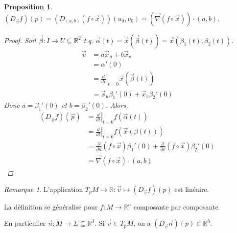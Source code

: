 \documentclass{report}
\newtheorem*{prop}{Proposition}
\theoremstyle{definition}
\theoremstyle{remark}
\newtheorem*{rmq}{Remarque}
\def\RR{\mathbb{R}}
\begin{document}
	\begin{prop}
		$(D_{\vec v}f)(p) = (D_{(a,b)}(f\circ\vec x))(u_0,v_0) = (\vec\nabla(f\circ\vec x))\cdot(a,b)$.
		\begin{proof}
			Soit $\vec\beta:I\to U\subseteq\RR^2$ t.q. $\vec\alpha(t)=\vec x(\vec\beta(t)) = \vec x(\beta_1(t), \beta_2(t))$.
			\begin{align*}
				\vec v&= a\vec x_u+b\vec x_v\\
				&= \alpha'(0)\\
				&= \left.\frac{d}{dt}\right|_{t=0}\vec x(\vec\beta(t))\\
				&= \vec x_u\beta_1'(0)+\vec x_v\beta_2'(0)
			\end{align*}
			Donc $a=\beta_1'(0)$ et $b=\beta_2'(0)$. Alors,
			\begin{align*}
				(D_{\vec v}f)(\vec p)&= \left.\frac{d}{dt}\right|_{t=0} f(\vec\alpha(t))\\
				&= \left.\frac{d}{dt}\right|_{t=0} f(\vec x(\beta(t)))\\
				&= \frac{\partial}{\partial u}(f\circ\vec x)\beta_1'(0) + \frac{\partial}{\partial v}(f\circ\vec x)\beta_2'(0)\\
				&= \vec\nabla(f\circ\vec x)\cdot(a,b)
			\end{align*}
		\end{proof}
	\end{prop}

	\begin{rmq}
		L'application $T_pM\to\RR : \vec v\mapsto(D_{\vec v}f)(p)$ est lin\'eaire.

		La d\'efinition se g\'en\'eralise pour $f:M\to\RR^n$ composante par composante.

		En particulier $\vec n:M\to\Sigma\subseteq\RR^3$. Si $\vec v\in T_pM$, on a $(D_{\vec v}\vec n)(p)\in\RR^3$.
	\end{rmq}
\end{document}

